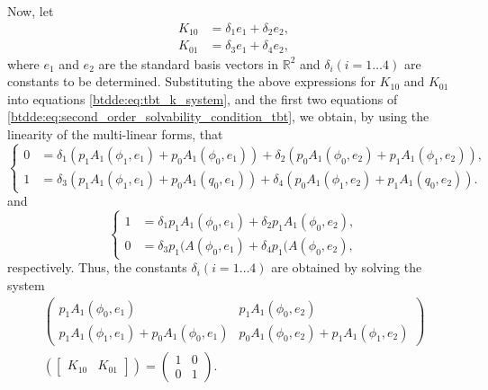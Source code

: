 Now, let
\begin{align*}
K_{10} & = \delta_1e_1 + \delta_2e_2,\\
K_{01} & = \delta_3e_1 + \delta_4e_2,
\end{align*}
where $e_1$ and $e_2$ are the standard basis vectors in $\mathbb R^2$ and
$\delta_i(i = 1\dots4)$ are constants to be determined. Substituting the above
expressions for $K_{10}$ and $K_{01}$ into equations
\cref{btdde:eq:tbt_k_system}, and the first two equations of
\cref{btdde:eq:second_order_solvability_condition_tbt}, we obtain, by using the
linearity of the multi-linear forms, that
\begin{equation}
\begin{cases}
0 & = \delta_1\left(p_1A_1(\phi_1,e_1) + p_0A_1(\phi_0,e_1)\right) + \delta_2\left(p_0A_1(\phi_0,e_2) + p_1A_1(\phi_1,e_2)\right),\\
1 & = \delta_3\left(p_1A_1(\phi_1,e_1) + p_0A_1(q_0,e_1)\right) + \delta_4\left(p_0A_1(\phi_1,e_2) + p_1A_1(q_0,e_2)\right).
\end{cases}
\end{equation}
and
\begin{equation}
\begin{cases}
1 & = \delta_1p_1A_1(\phi_0,e_1) + \delta_2p_1A_1(\phi_0,e_2),\\
0 & = \delta_3p_1(A(\phi_0,e_1) + \delta_4p_1(A(\phi_0,e_2),
\end{cases}
\end{equation}
respectively. Thus, the constants $\delta_i(i = 1\dots4)$ are obtained
by solving the system
\begin{multline*}
\left(\begin{array}{cc}
p_1A_1(\phi_0,e_1) & p_1A_1(\phi_0,e_2)\\
p_1A_1(\phi_1,e_1) + p_0A_1(\phi_0,e_1) & p_0A_1(\phi_0,e_2) + p_1A_1(\phi_1,e_2)
\end{array}\right)\\
\left(\left[\begin{array}{cc}
K_{10} & K_{01}\end{array}\right]\right) = \left(\begin{array}{cc}
1 & 0\\
0 & 1
\end{array}\right).
\end{multline*}

